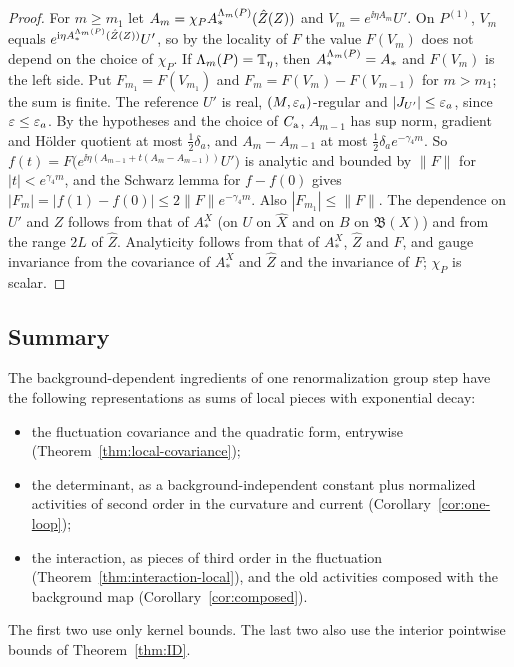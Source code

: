 \begin{proof}
For $m\ge m_1$ let $A_m=\chi_PA^{\Lambda_m(P)}_*(\hat Z(Z))$ and $V_m=e^{\ii\eta A_m}U'$. On $P^{(1)}$, $V_m$ equals $e^{\mathrm i\eta A^{\Lambda_m(P)}_*(\hat Z(Z))}U'$, so by the locality of $F$ the value $F(V_m)$ does not depend on the choice of $\chi_P$. If $\Lambda_m(P)=\mathbb T_\eta$, then $A^{\Lambda_m(P)}_*=A_*$ and $F(V_m)$ is the left side. Put $F_{m_1}=F(V_{m_1})$ and $F_m=F(V_m)-F(V_{m-1})$ for $m>m_1$; the sum is finite. The reference $U'$ is real, $(M,\varepsilon_a)$-regular and $|J_{U'}|\le\varepsilon_a$, since $\varepsilon\le\varepsilon_a$. By the hypotheses and the choice of $C_{\rm a}$, $A_{m-1}$ has sup norm, gradient and H\"older quotient at most $\frac12\delta_a$, and $A_m-A_{m-1}$ at most $\frac12\delta_ae^{-\gamma_4m}$. So $f(t)=F\big(e^{\ii\eta(A_{m-1}+t(A_m-A_{m-1}))}U'\big)$ is analytic and bounded by $\|F\|$ for $|t|<e^{\gamma_4m}$, and the Schwarz lemma for $f-f(0)$ gives $|F_m|=|f(1)-f(0)|\le2\|F\|e^{-\gamma_4m}$. Also $|F_{m_1}|\le\|F\|$. The dependence on $U'$ and $Z$ follows from that of $A^X_*$ (on $U$ on $\hat X$ and on $B$ on $\mathfrak B(X)$) and from the range $2L$ of $\hat Z$. Analyticity follows from that of $A^X_*$, $\hat Z$ and $F$, and gauge invariance from the covariance of $A^X_*$ and $\hat Z$ and the invariance of $F$; $\chi_P$ is scalar.
\end{proof}

\subsection{Summary}

The background-dependent ingredients of one renormalization group step have the following representations as sums of local pieces with exponential decay:
\begin{itemize}
\item the fluctuation covariance and the quadratic form, entrywise (Theorem~\ref{thm:local-covariance});
\item the determinant, as a background-independent constant plus normalized activities of second order in the curvature and current (Corollary~\ref{cor:one-loop});
\item the interaction, as pieces of third order in the fluctuation (Theorem~\ref{thm:interaction-local}), and the old activities composed with the background map (Corollary~\ref{cor:composed}).
\end{itemize}
The first two use only kernel bounds. The last two also use the interior pointwise bounds of Theorem~\ref{thm:ID}.

